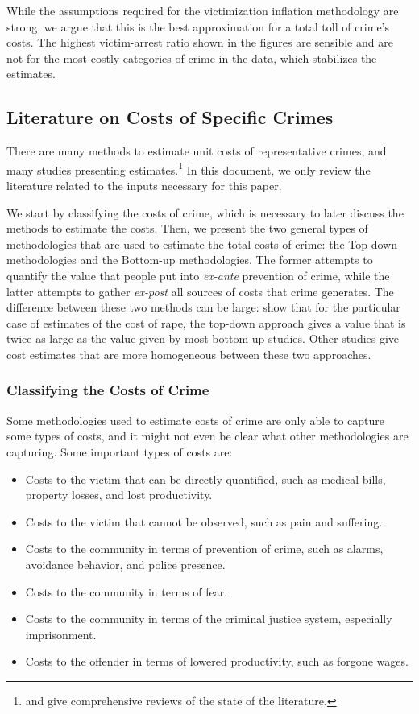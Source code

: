 \noindent While the assumptions required for the victimization inflation methodology are strong, we argue that this is the best approximation for a total toll of crime's costs. The highest victim-arrest ratio shown in the figures are sensible and are not for the most costly categories of crime in the data, which stabilizes the estimates. 

\subsection{Literature on Costs of Specific Crimes}
\noindent There are many methods to estimate unit costs of representative crimes, and many studies presenting estimates.\footnote{\citet{Cohen-Bowles_2010_Estimating-Cost-Crime} and \citet{McCollister_etal_2010_DAD} give comprehensive reviews of the state of the literature.} In this document, we only review the literature related to the inputs necessary for this paper. 

\noindent We start by classifying the costs of crime, which is necessary to later discuss the methods to estimate the costs. Then, we present the two general types of methodologies that are used to estimate the total costs of crime: the Top-down methodologies and the Bottom-up methodologies. The former attempts to quantify the value that people put into \emph{ex-ante} prevention of crime, while the latter attempts to gather \emph{ex-post} all sources of costs that crime generates. The difference between these two methods can be large: \cite{Cohen-Bowles_2010_Estimating-Cost-Crime} show that for the particular case of estimates of the cost of rape, the top-down approach gives a value that is twice as large as the value given by most bottom-up studies. Other studies give cost estimates that are more homogeneous between these two approaches.

\subsubsection{Classifying the Costs of Crime}
\noindent Some methodologies used to estimate costs of crime are only able to capture some types of costs, and it might not even be clear what other methodologies are capturing. Some important types of costs are: 
\begin{itemize}
\item Costs to the victim that can be directly quantified, such as medical bills, property losses, and lost productivity.
\item Costs to the victim that cannot be observed, such as pain and suffering.
\item Costs to the community in terms of prevention of crime, such as alarms, avoidance behavior, and police presence.
\item Costs to the community in terms of fear.
\item Costs to the community in terms of the criminal justice system, especially imprisonment.
\item Costs to the offender in terms of lowered productivity, such as forgone wages.
\end{itemize}

